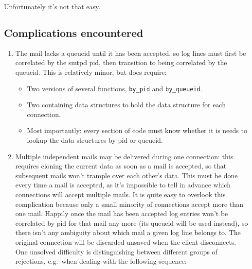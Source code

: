 \documentclass[a4paper,12pt,draft]{article}
\begin{document}
Unfortunately it's not that easy.


\subsection{Complications encountered}

\label{complications}

\begin{enumerate}

    \item The mail lacks a queueid until it has been accepted, so log lines
        must first be correlated by the smtpd pid, then transition to being
        correlated by the queueid.  This is relatively minor, but does
        require:

        \begin{itemize}

            \item Two versions of several functions, \texttt{by\_pid} and
                \texttt{by\_queueid}.

            \item Two containing data structures to hold the data
                structure for each connection.

            \item Most importantly: every section of code must know whether
                it is needs to lookup the data structures by pid or
                queueid.

        \end{itemize}

    \item Multiple independent mails may be delivered during one
        connection: this requires cloning the current data as soon as a
        mail is accepted, so that subsequent mails won't trample over each
        other's data.  This must be done every time a mail is accepted, as
        it's impossible to tell in advance which connections will accept
        multiple mails.  It is quite easy to overlook this complication
        because only a small minority of connections accept more than one
        mail. Happily once the mail has been accepted log entries won't be
        correlated by pid for that mail any more (its queueid will be used
        instead), so there isn't any ambiguity about which mail a given log
        line belongs to.  The original connection will be discarded unsaved
        when the client disconnects.  One unsolved difficulty is
        distinguishing between different groups of rejections, e.g.\ when
        dealing with the following sequence:


\end{enumerate}
\end{document}
